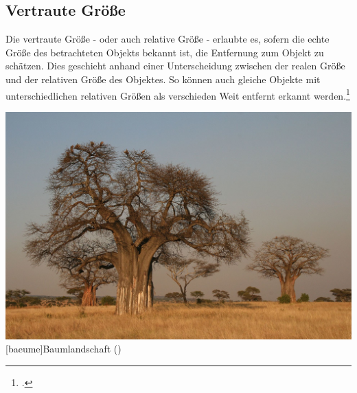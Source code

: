 \subsection{Vertraute Größe}
Die vertraute Größe - oder auch relative Größe - erlaubte es, sofern die echte Größe des betrachteten Objekts bekannt ist, die Entfernung zum Objekt zu schätzen. Dies geschieht anhand einer Unterscheidung zwischen der realen Größe und der relativen Größe des Objektes. So können auch gleiche Objekte mit unterschiedlichen relativen Größen als verschieden Weit entfernt erkannt werden.\footcite[Vgl.][S.43]{Ass16}

\vspace{1em}
\begin{minipage}{\linewidth}
	\centering
	\includegraphics[width=0.7\linewidth]{images/baeume.jpg}
	[baeume]{Baumlandschaft (\cite{yokyXX})}
	\label{fig:baeume}
\end{minipage}
\vspace{1em}

